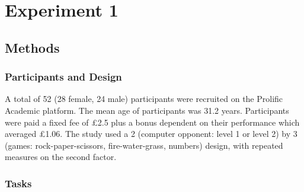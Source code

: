 \documentclass[man,floatsintext]{apa6}
\begin{document}
\hypertarget{experiment-1}{%
\section{Experiment 1}\label{experiment-1}}

\hypertarget{methods}{%
\subsection{Methods}\label{methods}}

\hypertarget{participants-and-design}{%
\subsubsection{Participants and Design}\label{participants-and-design}}

A total of 52 (28 female, 24 male) participants were recruited on the Prolific Academic platform. The mean age of participants was 31.2 years. Participants were paid a fixed fee of £2.5 plus a bonus dependent on their performance which averaged £1.06. The study used a 2 (computer opponent: level 1 or level 2) by 3 (games: rock-paper-scissors, fire-water-grass, numbers) design, with repeated measures on the second factor.

\hypertarget{tasks}{%
\subsubsection{Tasks}\label{tasks}}
\end{document}
